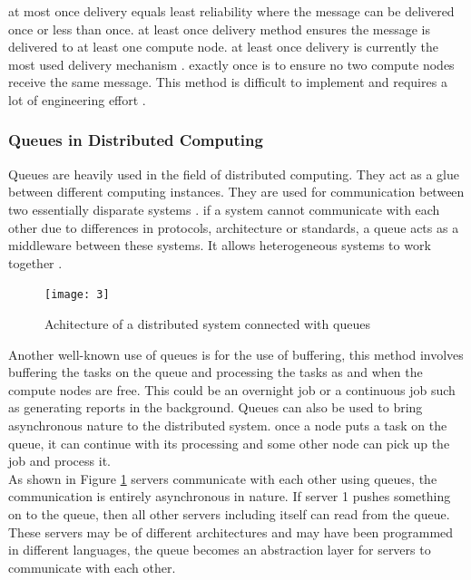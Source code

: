 \documentclass[12pt,a4paper]{article}
\begin{document}
at most once delivery equals least reliability where the message can be delivered once or less than once. at least once delivery method ensures the message is delivered to at least one compute node. at least once delivery is currently the most used delivery mechanism \citep{toshniwal2014storm}. exactly once is to ensure no two compute nodes receive the same message. This method is difficult to implement and requires a lot of engineering effort \citep{amit2007guaranteed}.
	
\subsubsection{Queues in Distributed Computing}
Queues are heavily used in the field of distributed computing. They act as a glue between different computing instances. They are used for communication between two essentially disparate systems \citep{arroyo2006method}. if a system cannot communicate with each other due to differences in protocols, architecture or standards, a queue acts as a middleware between these systems. It allows heterogeneous systems to work together \citep{arroyo2006method}.\\

 
 \begin{figure}
 	\centering
 	\textbf{}\par\medskip
 	\texttt{[image: 3]}
 	\caption{Achitecture of a distributed system connected with queues}
 	\label{fig:gdull03}
 \end{figure}

Another well-known use of queues is for the use of buffering, this method involves buffering the tasks on the queue and processing the tasks as and when the compute nodes are free. This could be an overnight job or a continuous job such as generating reports in the background. Queues can also be used to bring asynchronous nature to the distributed system. once a node puts a task on the queue, it can continue with its processing and some other node can pick up the job and process it.\\

As shown in Figure \ref{fig:gdull03} servers communicate with each other using queues, the communication is entirely asynchronous in nature. If server 1 pushes something on to the queue, then all other servers including itself can read from the queue. These servers may be of different architectures and may have been programmed in different languages, the queue becomes an abstraction layer for servers to communicate with each other\citep{shiang2008queuing}.
\end{document}
